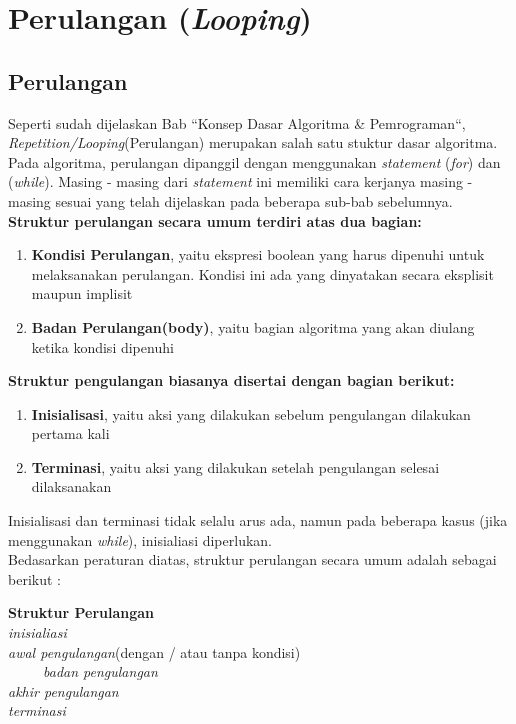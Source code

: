 \chapter{Perulangan (\textit{Looping})}

\section{Perulangan}
Seperti sudah dijelaskan Bab ``Konsep Dasar Algoritma \& Pemrograman``, \textit{Repetition/Looping}(Perulangan) merupakan salah satu stuktur dasar algoritma. Pada algoritma, perulangan dipanggil dengan menggunakan \textit{statement} (\textit{for}) dan (\textit{while}). Masing - masing dari \textit{statement} ini memiliki cara kerjanya masing - masing sesuai yang telah dijelaskan pada beberapa sub-bab sebelumnya.   \\
\hfill \break
\textbf{Struktur perulangan secara umum terdiri atas dua bagian:}
\begin{enumerate}
	\item \textbf{Kondisi Perulangan}, yaitu ekspresi boolean yang harus dipenuhi untuk melaksanakan perulangan. Kondisi ini ada yang dinyatakan secara eksplisit maupun implisit
		\item \textbf{Badan Perulangan(body)}, yaitu bagian algoritma yang akan diulang ketika kondisi dipenuhi \\
\end{enumerate}
\hfill \break
\textbf{Struktur pengulangan biasanya disertai dengan bagian berikut:} 
\begin{enumerate}
	\item \textbf{Inisialisasi}, yaitu aksi yang dilakukan sebelum pengulangan dilakukan pertama kali 
	\item \textbf{Terminasi}, yaitu aksi yang dilakukan setelah pengulangan selesai dilaksanakan
\end{enumerate}
Inisialisasi dan terminasi tidak selalu arus ada, namun pada beberapa kasus (jika menggunakan \textit{while}), inisialiasi diperlukan. \\
\hfill \break
Bedasarkan peraturan diatas, struktur perulangan secara umum adalah sebagai berikut : 
\newpage
\begin{Petunjuk}
\label{Ptk:Struktur Perulangan}
	\textbf{Struktur Perulangan}\\
		\textit{inisialiasi}\\
		\textit{awal pengulangan}(dengan / atau tanpa kondisi)\\
		~~~~~\textit{badan pengulangan}\\
		\textit{akhir pengulangan}\\
		\textit{terminasi}\\
\end{Petunjuk}

